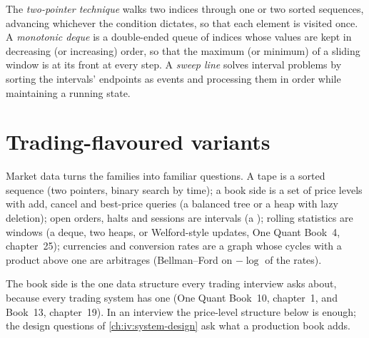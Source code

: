 \begin{definition}\label{def:iv:algorithms-and-data-structures:families}
The \emph{two-pointer technique} walks two indices through one or two sorted sequences, advancing
whichever the condition dictates, so that each element is visited once. A \emph{monotonic deque} is a
double-ended queue of indices whose values are kept in decreasing (or increasing) order, so that the maximum (or minimum) of a
sliding window is at its front at every step. A \emph{sweep line} solves interval problems by sorting the
intervals' endpoints as events and processing them in order while maintaining a running state.
\end{definition}

\label{lst:iv:algorithms-and-data-structures:slidingmax}

\section{Trading-flavoured variants}

Market data turns the families into familiar questions. A tape is a sorted sequence (two pointers, binary search by time);
a book side is a set of price levels with add, cancel and best-price queries (a balanced tree or a heap with lazy deletion);
open orders, halts and sessions are intervals (a ); rolling statistics are windows (a deque, two heaps, or
Welford-style updates, One Quant Book~4, chapter~25); currencies and conversion rates are a graph whose cycles with a product
above one are arbitrages (Bellman--Ford on $-\log$ of the rates).

\label{lst:iv:algorithms-and-data-structures:sweep}

The book side is the one data structure every trading interview asks about, because every trading system has one (One Quant
Book~10, chapter~1, and Book~13, chapter~19). In an interview the price-level structure below is enough; the design questions
of \cref{ch:iv:system-design} ask what a production book adds.


